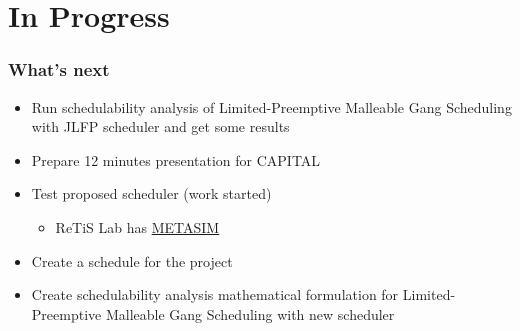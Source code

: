 \documentclass[pdf]{beamer}
\begin{document}
\section{In Progress}

\begin{frame}
    \frametitle{What's next}

    \begin{itemize}
        \item Run schedulability analysis of Limited-Preemptive Malleable Gang Scheduling with JLFP scheduler and get some results
        \item Prepare 12 minutes presentation for CAPITAL
        \item Test proposed scheduler (work started)
        \begin{itemize}
            \item ReTiS Lab has \href{https://github.com/ReTiS-Lab/METASIM}{METASIM}
        \end{itemize}
        \item Create a schedule for the project
        \item Create schedulability analysis mathematical formulation for Limited-Preemptive Malleable Gang Scheduling with new scheduler
    \end{itemize}
    
\end{frame}
\end{document}
